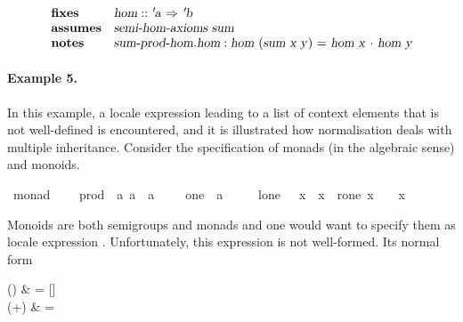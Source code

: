 \begin{isabellebody}
\begin{isamarkuptext}
\[\begin{array}{ll}
  \textbf{fixes} & \isa{hom} :: \isa{{\isachardoublequote}{\isacharprime}a\ {\isasymRightarrow}\ {\isacharprime}b{\isachardoublequote}} \\
  \textbf{assumes} & \isa{{\isachardoublequote}semi{\isacharunderscore}hom{\isacharunderscore}axioms\ sum{\isachardoublequote}} \\
  \textbf{notes} & \isa{sum{\isacharunderscore}prod{\isacharunderscore}hom{\isachardot}hom}:
    \isa{hom\ {\isacharparenleft}sum\ x\ y{\isacharparenright}\ {\isacharequal}\ hom\ x\ {\isasymcdot}\ hom\ y}
\end{array}
\]

\paragraph{Example 5.}
  In this example, a locale expression leading to a list of context
  elements that is not well-defined is encountered, and it is illustrated
  how normalisation deals with multiple inheritance.
  Consider the specification of monads (in the algebraic sense)
  and monoids.%
\end{isamarkuptext}%
\isamarkuptrue%
\ monad\ {\isacharequal}\isanewline
\ \ \ prod\ {\isacharcolon}{\isacharcolon}\ {\isachardoublequote}{\isacharbrackleft}{\isacharprime}a{\isacharcomma}\ {\isacharprime}a{\isacharbrackright}\ {\isasymRightarrow}\ {\isacharprime}a{\isachardoublequote}\ {\isacharparenleft}\ {\isachardoublequote}{\isasymcdot}{\isachardoublequote}\ {}{}{\isacharparenright}\ \ one\ {\isacharcolon}{\isacharcolon}\ {\isacharprime}a\ {\isacharparenleft}{\isachardoublequote}{\isasymone}{\isachardoublequote}\ {}{}{}{\isacharparenright}\isanewline
\ \ \ l{\isacharunderscore}one{\isacharcolon}\ {\isachardoublequote}{\isasymone}\ {\isasymcdot}\ x\ {\isacharequal}\ x{\isachardoublequote}\ \ r{\isacharunderscore}one{\isacharcolon}\ {\isachardoublequote}x\ {\isasymcdot}\ {\isasymone}\ {\isacharequal}\ x{\isachardoublequote}\isamarkupfalse%
%
\begin{isamarkuptext}%
Monoids are both semigroups and monads and one would want to
  specify them as locale expression .
  Unfortunately, this expression is not well-formed.  Its normal form
\begin{align*%
}
  \N() & = [] \\
  \N(+) & =

\end{align*%
}
\end{isamarkuptext}
\end{isabellebody}
